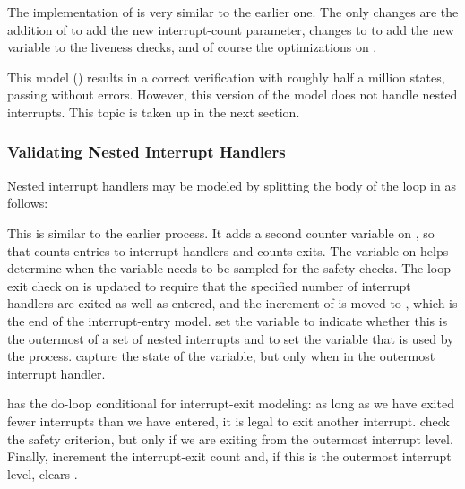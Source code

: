 \begin{fcvref}
The implementation of  is very similar
to the earlier one.
The only changes are the addition of  to add the new
interrupt-count parameter, changes to
 to add the new  variable
to the liveness checks, and of course the optimizations on .
\end{fcvref}

This model ()
results in a correct verification with roughly half a million
states, passing without errors.
However, this version of the model does not handle nested
interrupts.
This topic is taken up in the next section.

\subsubsection{Validating Nested Interrupt Handlers}
\label{sec:formal:Validating Nested Interrupt Handlers}

Nested interrupt handlers may be modeled by splitting the body of
the loop in  as follows:



\begin{fcvref}
This is similar to the earlier  process.
It adds a second counter variable  on , so that
 counts entries to interrupt handlers and 
counts exits.
The  variable on  helps determine
when the  variable needs to be sampled
for the safety checks.
The loop-exit check on  is updated to require that the
specified number of interrupt handlers are exited as well as entered,
and the increment of  is moved to , which is
the end of the interrupt-entry model.
 set the  variable to indicate
whether this is the outermost of a set of nested interrupts and to
set the  variable that is used by the
 process.
 capture the state of the 
variable, but only when in the outermost interrupt handler.

 has the do-loop conditional for interrupt-exit modeling:
as long as we have exited fewer interrupts than we have entered, it is
legal to exit another interrupt.
check the safety criterion, but only if we are exiting
from the outermost interrupt level.
Finally,  increment the interrupt-exit count 
and, if this is the outermost interrupt level, clears
.
\end{fcvref}

